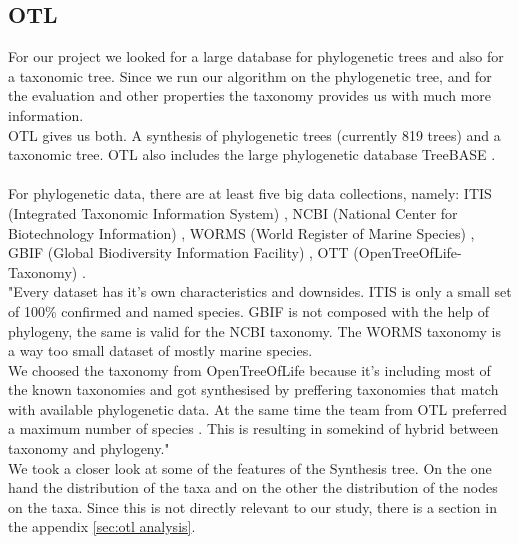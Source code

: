     \subsection{OTL}
      For our project we looked for a large database for phylogenetic trees and also for a taxonomic 
        tree. Since we run our algorithm on the phylogenetic tree, and for the evaluation and other 
        properties the taxonomy provides us with much more information. \\
      OTL gives us both. A synthesis of phylogenetic trees (currently 819 trees) and a taxonomic tree. 
        OTL also includes the large phylogenetic database TreeBASE \cite{Hinchliff2015}. \\
       \\
      For phylogenetic data, there are at least five big data collections, namely: ITIS (Integrated 
        Taxonomic Information System) \cite{ITIS}, NCBI (National Center for Biotechnology Information) 
        \cite{NCBI1988}, WORMS (World Register of Marine Species) \cite{WoRMS2018}, GBIF (Global 
        Biodiversity Information Facility) \cite{GBIF}, OTT (OpenTreeOfLife-Taxonomy) 
        \cite{Hinchliff2015}. \\
       "Every dataset has it's own characteristics and downsides. ITIS is only a small 
        set of 100\% confirmed and named species. GBIF is not composed with the help of phylogeny, the 
        same is valid for the NCBI taxonomy. The WORMS taxonomy is a way too small dataset of mostly 
        marine species. \\
      We choosed the taxonomy from OpenTreeOfLife because it's including most of the known taxonomies 
        and got synthesised by preffering taxonomies that match with available phylogenetic data. At the 
        same time the team from OTL preferred a maximum number of species \cite{Hinchliff2015}. This is 
        resulting in somekind of hybrid between taxonomy and phylogeny." \\

      We took a closer look at some of the features of the Synthesis tree. On the one hand the 
        distribution of the taxa and on the other the distribution of the nodes on the taxa. Since this
        is not directly relevant to our study, there is a section in the appendix \ref{sec:otl analysis}.

